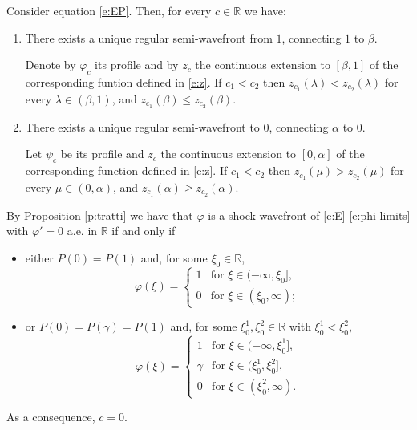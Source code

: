 \documentclass[10pt,a4paper]{amsart}
\newcommand{\R}{\mathbb R}
\renewcommand{\phi}{\varphi}
\begin{document}
\begin{proposition}\label{p:twins}
Consider equation \eqref{e:EP}. Then, for every $c\in\R$ we have:
\begin{enumerate}[label=(\arabic*)]
\item There exists a unique regular semi-wavefront from $1$, connecting $1$ to $\beta$.

Denote by $\phi_c$ its profile and by $z_c$ the continuous extension to $[\beta,1]$ of the corresponding funtion defined in \eqref{e:z}.  If $c_1 < c_2$ then $z_{c_1}(\lambda) < z_{c_2}(\lambda)$ for every $\lambda \in (\beta, 1)$, and $z_{c_1}(\beta) \le z_{c_2}(\beta)$.

  \item There exists a unique regular semi-wavefront to $0$, connecting $\alpha$ to $0$.

Let $\psi_c$ be its profile and $z_c$ the continuous extension to $[0,\alpha]$ of the corresponding function defined in \eqref{e:z}. If $c_1 < c_2$ then $z_{c_1}(\mu) > z_{c_2}(\mu)$ for every $\mu \in (0,\alpha)$, and $z_{c_1}(\alpha)\ge z_{c_2}(\alpha)$.
\end{enumerate}
\end{proposition}

\begin{remark}
\label{rem:2jumps}
{\rm 
By Proposition \ref{p:tratti} we have that $\phi$ is a shock wavefront of \eqref{e:E}-\eqref{e:phi-limits} with  $\phi'=0$ a.e. in $\mathbb{R}$ if and only if \begin{itemize}
\item either $P(0)=P(1)$ and, for some $\xi_0 \in \mathbb{R}$,
\[
\phi(\xi)=\begin{cases}
1 & \text{for } \xi \in (-\infty,\xi_0], \\%
0 & \text{for } \xi \in (\xi_0,\infty);
\end{cases}
\]

\item or $P(0)=P(\gamma)=P(1)$ and, for some $\xi_0^1, \xi_0^2 \in \mathbb{R}$ with $\xi_0^1 < \xi_0^2$,
\[
\phi(\xi)=\begin{cases}
1 & \text{for } \xi \in (-\infty, \xi_0^1], \\%
\gamma & \text{for } \xi \in (\xi_0^1, \xi_0^2], \\%
0 & \text{for } \xi \in (\xi_0^2,\infty).
\end{cases}
\]
\end{itemize}
As a consequence, $c=0$.}
\end{remark}
\end{document}
